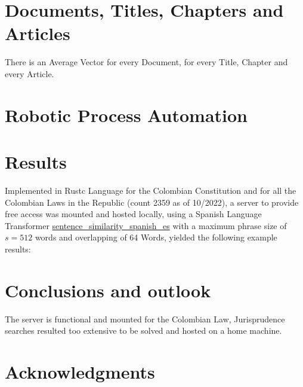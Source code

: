 \documentclass[a4paper,fleqn]{cas-sc}
\begin{document}
\section{Documents, Titles, Chapters and Articles}
There is an Average Vector for every Document, for every Title, Chapter and every Article. 

\section{Robotic Process Automation}

\section{Results}
Implemented in Rustc Language for the Colombian Constitution 
and for all the Colombian Laws in the Republic (count 2359 as of 10/2022), 
a server to provide free access was mounted and hosted locally, 
using a Spanish Language Transformer \href{https://huggingface.co/hiiamsid/sentence_similarity_spanish_es}{sentence\_similarity\_spanish\_es} 
with a maximum phrase size of $s=512$ words and overlapping of 64 Words, yielded the following example results:  

\section{Conclusions and outlook}
The server is functional and mounted for the Colombian Law, Jurisprudence searches resulted too extensive to be solved and hosted on a 
home machine. 

\section{Acknowledgments}


\end{document}
